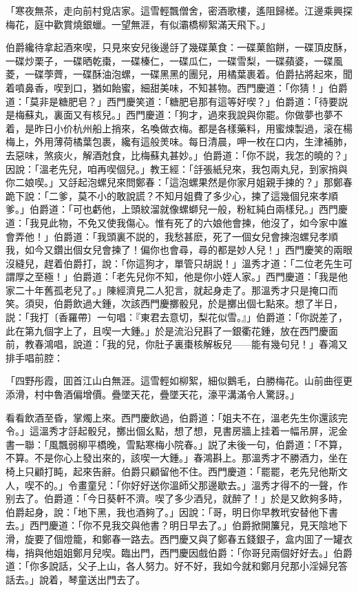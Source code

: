 \begin{myquote}
「寒夜無茶，走向前村覓店家。這雪輕飄僧舍，密酒歌樓，遙阻歸槎。江邊乘興探梅花，庭中歡賞燒銀蠟。一望無涯，有似灞橋柳絮滿天飛下。」
\end{myquote}

伯爵纔待拿起酒來喫，只見來安兒後邊㧱了幾碟菓食：一碟菓餡餅，一碟頂皮酥，一碟炒栗子，一碟晒乾棗，一碟榛仁，一碟瓜仁，一碟雪梨，一碟蘋婆，一碟風菱，一碟荸薺，一碟酥油泡螺，一碟黑黑的團兒，用橘葉裹着。伯爵拈將起來，聞着噴鼻香，喫到口，猶如飴蜜，細甜美味，不知甚物。西門慶道：「你猜！」伯爵道：「莫非是糖肥皂？」西門慶笑道：「糖肥皂那有這等好喫？」伯爵道：「待要説是梅蘇丸，裏面又有核兒。」西門慶道：「狗才，過來我說與你罷。你做夢也夢不着，是昨日小价杭州船上捎來，名喚做衣梅。都是各樣藥料，用蜜煉製過，滚在楊梅上，外用薄荷橘葉包裹，纔有這般羙味。每日清晨，呷一枚在口内，生津補肺，去惡味，煞痰火，解酒尅食，比梅蘇丸甚妙。」伯爵道：「你不説，我怎的曉的？」因說：「溫老先兒，咱再喫個兒。」教王經：「㧱張紙兒來，我包兩丸兒，到家捎與你二娘喫。」又㧱起泡螺兒來問鄭春：「這泡螺果然是你家月姐親手揀的？」那鄭春跪下說：「二爹，莫不小的敢說謊？不知月姐費了多少心，揀了這幾個兒來孝順爹。」伯爵道：「可也虧他，上頭紋溜就像螺螄兒一般，粉紅純白兩樣兒。」西門慶道：「我見此物，不免又使我傷心。惟有死了的六娘他會揀，他沒了，如今家中誰會弄他！」伯爵道：「我頭裏不説的，我愁甚麽，死了一個女兒會揀泡螺兒孝順我，如今又鑽出個女兒會揀了！偏你也會尋，尋的都是妙人兒！」西門慶笑的兩眼沒縫兒，趕着伯爵打，說：「你這狗才，單管只胡説！」溫秀才道：「二位老先生可謂厚之至極！」伯爵道：「老先兒你不知，他是你小姪人家。」西門慶道：「我是他家二十年舊孤老兒了。」陳經濟見二人犯言，就起身走了。那溫秀才只是掩口而笑。須臾，伯爵飲過大鍾，次該西門慶擲骰兒，於是擲出個七點來。想了半日，説：「我打〔香羅帶〕一句唱：『東君去意切，梨花似雪。』」伯爵道：「你説差了，此在第九個字上了，且喫一大鍾。」於是流沿兒斟了一銀衢花鍾，放在西門慶面前，教春鴻唱，說道：「我的兒，你肚子裏棗核解板兒——能有幾句兒！」春鴻又排手唱前腔：

\begin{myquote}
「四野彤霞，囬首江山白無涯。這雪輕如柳絮，細似鵝毛，白勝梅花。山前曲徑更添滑，村中魯酒偏增價。疊墜天花，疊墜天花，濠平溝滿令人驚訝。」
\end{myquote}

看看飲酒至昏，掌燭上來。西門慶飲過，伯爵道：「姐夫不在，溫老先生你還該完令。」這溫秀才㧱起骰兒，擲出個幺點，想了想，見書房牆上挂着一幅吊屏，泥金書一聯：「風飄弱柳平橋晚，雪點寒梅小院春。」説了未後一句，伯爵道：「不算，不算。不是你心上發出來的，該喫一大鍾。」春鴻斟上。那溫秀才不勝酒力，坐在椅上只顧打盹，起來告辭。伯爵只顧留他不住。西門慶道：「罷罷，老先兒他斯文人，喫不的。」令畫童兒：「你好好送你溫師父那邊歇去。」溫秀才得不的一聲，作别去了。伯爵道：「今日葵軒不濟。喫了多少酒兒，就醉了！」於是又飲夠多時，伯爵起身，說：「地下黑，我也酒夠了。」因說：「哥，明日你早教玳安替他下書去。」西門慶道：「你不見我交與他書？明日早去了。」伯爵掀開簾兒，見天陰地下滑，旋要了個燈籠，和鄭春一路去。西門慶又與了鄭春五錢銀子，盒内囬了一罐衣梅，捎與他姐姐鄭月兒喫。臨出門，西門慶因戲伯爵：「你哥兒兩個好好去。」伯爵道：「你多說話，父子上山，各人努力。好不好，我如今就和鄭月兒那小淫婦兒答話去。」說着，琴童送出門去了。

